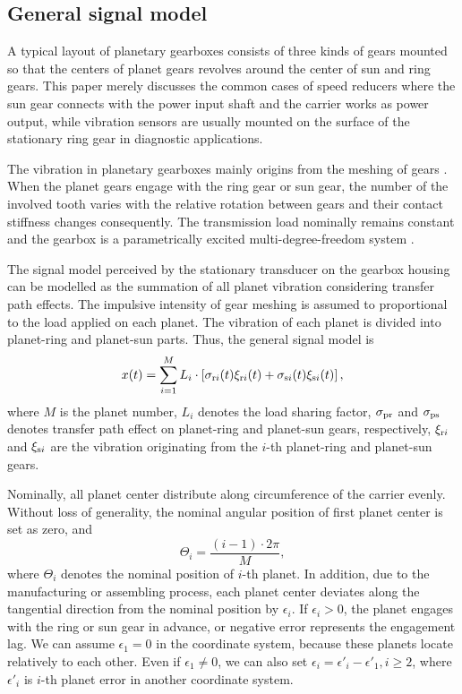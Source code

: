 \documentclass[a4paper,fleqn]{cas-sc}%
\begin{document}
\subsection{General signal model}
\par A typical layout of planetary gearboxes consists of three kinds of gears mounted so that the centers of planet gears revolves around the center of sun and ring gears. This paper merely discusses the common cases of speed reducers where the sun gear connects with the power input shaft and the carrier works as power output, while vibration sensors are usually mounted on the surface of the stationary ring gear in diagnostic applications. 

\par The vibration in planetary gearboxes mainly origins from the meshing of gears \cite{Velex1996}. When the planet gears engage with the ring gear or sun gear, the number of the involved tooth varies with the relative rotation between gears and their contact stiffness changes consequently. The transmission load nominally remains constant and the gearbox is a parametrically excited multi-degree-freedom system \cite{Acar2019}. 
\par The signal model perceived by the stationary transducer on the gearbox housing can be modelled as the summation of all planet vibration considering transfer path effects. The impulsive intensity of gear meshing is assumed to proportional to the load applied on each planet. The vibration of each planet is divided into planet-ring and planet-sun parts. Thus, the general signal model is
\begin{equation}
    x(t)=\sum_{i=1}^{M} L_i \cdot \left[ \sigma_{{\rm r}i}(t) \xi_{{\rm r}i}(t) + \sigma_{{\rm s}i}(t) \xi_{{\rm s}i}(t) \right], \label{eq:general_signal}
\end{equation}
where $M$ is the planet number, $L_i$ denotes the load sharing factor, $\sigma_{\rm pr}$ and $\sigma_{\rm ps}$ denotes transfer path effect on planet-ring and planet-sun gears, respectively, $\xi_{{\rm r}i}$ and $\xi_{{\rm s}i}$ are the vibration originating from the $i$-th planet-ring and planet-sun gears.
\par Nominally, all planet center distribute along circumference of the carrier evenly. Without loss of generality, the nominal angular position of first planet center is set as zero, and
\begin{equation}
    \Theta_i=\frac{(i-1)\cdot 2\pi}{M},
\end{equation}
where $\Theta_i$ denotes the nominal position of $i$-th planet. In addition, due to the manufacturing or assembling process, each planet center deviates along the tangential direction from the nominal position by $\epsilon_i$. If $\epsilon_i>0$, the planet engages with the ring or sun gear in advance, or negative error represents the engagement lag. We can assume $\epsilon_1=0$ in the coordinate system, because these planets locate relatively to each other. Even if $\epsilon_1 \neq 0$, we can also set $\epsilon_i=\epsilon'_i-\epsilon'_1,i \geq 2$, where $\epsilon'_i$ is $i$-th planet error in another coordinate system.
\end{document}
